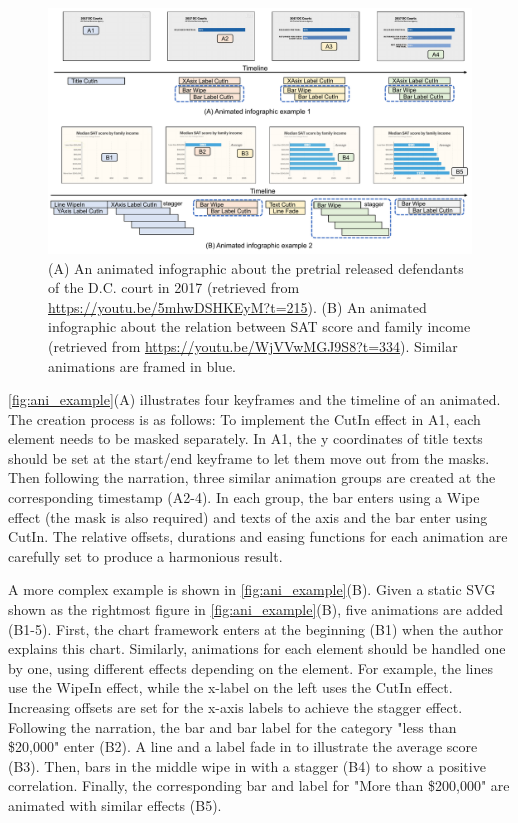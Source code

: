 \begin{figure}[h]
  \centering
  \includegraphics[width=\linewidth]{figs/ani_example.pdf}
  \caption{(A) An animated infographic about the pretrial released defendants of the D.C. court in 2017 (retrieved from \url{https://youtu.be/5mhwDSHKEyM?t=215}). (B) An animated infographic about the relation between SAT score and family income (retrieved from \url{https://youtu.be/WjVVwMGJ9S8?t=334}). Similar animations are framed in blue. }
  \label{fig:ani_example}
\end{figure}

\autoref{fig:ani_example}(A) illustrates four keyframes and the timeline of an animated.
The creation process is as follows:
To implement the CutIn effect in A1, each element needs to be masked separately.
In A1, the y coordinates of title texts should be set at the start/end keyframe to let them move out from the masks.
Then following the narration, three similar animation groups are created at the corresponding timestamp (A2-4).
In each group, the bar enters using a Wipe effect (the mask is also required) and texts of the axis and the bar enter using CutIn.
The relative offsets, durations and easing functions for each animation are carefully set to produce a harmonious result.

A more complex example is shown in \autoref{fig:ani_example}(B). 
Given a static SVG shown as the rightmost figure in \autoref{fig:ani_example}(B), five animations are added (B1-5).
First, the chart framework enters at the beginning (B1) when the author explains this chart.
Similarly, animations for each element should be handled one by one, using different effects depending on the element. 
For example, the lines use the WipeIn effect, while the x-label on the left uses the CutIn effect. Increasing offsets are set for the x-axis labels to achieve the stagger effect.
Following the narration, the bar and bar label for the category "less than \$20,000" enter (B2).
A line and a label fade in to illustrate the average score (B3).
Then, bars in the middle wipe in with a stagger (B4) to show a positive correlation.
Finally, the corresponding bar and label for "More than \$200,000" are animated with similar effects (B5).

